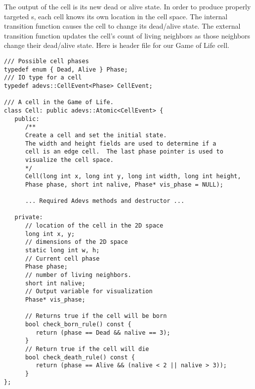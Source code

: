 The output of the cell is its new dead or alive state. In order to produce properly targeted s, each cell knows its own location in the cell space. The internal transition function causes the cell to change its dead/alive state. The external transition function updates the cell's count of living neighbors as those neighbors change their dead/alive state. Here is header file for our Game of Life cell.
\begin{verbatim}
/// Possible cell phases
typedef enum { Dead, Alive } Phase;
/// IO type for a cell
typedef adevs::CellEvent<Phase> CellEvent;

/// A cell in the Game of Life.  
class Cell: public adevs::Atomic<CellEvent> {
   public:
      /**
      Create a cell and set the initial state.
      The width and height fields are used to determine if a
      cell is an edge cell.  The last phase pointer is used to
      visualize the cell space.
      */
      Cell(long int x, long int y, long int width, long int height, 
      Phase phase, short int nalive, Phase* vis_phase = NULL);

      ... Required Adevs methods and destructor ...

   private:   
      // location of the cell in the 2D space
      long int x, y;
      // dimensions of the 2D space
      static long int w, h;
      // Current cell phase
      Phase phase;
      // number of living neighbors.
      short int nalive;
      // Output variable for visualization
      Phase* vis_phase;

      // Returns true if the cell will be born
      bool check_born_rule() const {
         return (phase == Dead && nalive == 3);
      }
      // Return true if the cell will die
      bool check_death_rule() const {
         return (phase == Alive && (nalive < 2 || nalive > 3));
      }
};
\end{verbatim}

